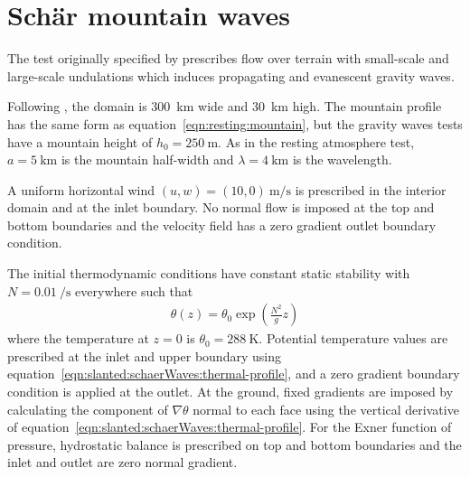 \section{Sch\"{a}r mountain waves}
\label{sec:slanted:schaerWaves}


The test originally specified by \citet{schaer2002} prescribes flow over terrain with small-scale and large-scale undulations which induces propagating and evanescent gravity waves.  

Following \citet{melvin2010}, the domain is \SI{300}{\kilo\meter} wide and \SI{30}{\kilo\meter} high.
The mountain profile has the same form as equation~\eqref{eqn:resting:mountain}, but the gravity waves tests have a mountain height of $h_0 = \SI{250}{\meter}$.  As in the resting atmosphere test, $a = \SI{5}{\kilo\meter}$ is the mountain half-width and $\lambda = \SI{4}{\kilo\meter}$ is the wavelength.

A uniform horizontal wind $(u, w) = (10, 0)\:\si{\meter\per\second}$ is prescribed in the interior domain and at the inlet boundary.  No normal flow is imposed at the top and bottom boundaries and the velocity field has a zero gradient outlet boundary condition.

The initial thermodynamic conditions have constant static stability with $N = \SI{0.01}{\per\second}$ everywhere such that
\begin{align}
	\theta(z) = \theta_0 \exp \left( \frac{N^2}{g} z \right) \label{eqn:slanted:schaerWaves:thermal-profile}
\end{align}
where the temperature at $z=0$ is $\theta_0 = \SI{288}{\kelvin}$.
Potential temperature values are prescribed at the inlet and upper boundary using equation~\eqref{eqn:slanted:schaerWaves:thermal-profile}, and a zero gradient boundary condition is applied at the outlet.
At the ground, fixed gradients are imposed by calculating the component of $\nabla \theta$ normal to each face using the vertical derivative of equation~\eqref{eqn:slanted:schaerWaves:thermal-profile}.
For the Exner function of pressure, hydrostatic balance is prescribed on top and bottom boundaries and the inlet and outlet are zero normal gradient.

